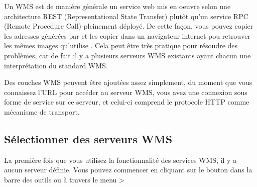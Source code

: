 Un WMS est de manière générale un service web mis en oeuvre selon une architecture REST (Representational State Transfer) plutôt qu'un service RPC (Remote Procedure Call) pleinement déployé. De cette façon, vous pouvez copier les adresses générées par \qg et les copier dans un navigateur internet pou retrouver les mêmes images qu'utilise \qg. Cela peut être très pratique pour résoudre des problèmes, car de fait il y a plusieurs serveurs WMS existants ayant chacun une interprétation du standard WMS.

Des couches WMS peuvent être ajoutées assez simplement, du moment que vous connaissez l'URL pour accéder au serveur WMS, vous avez une connexion sous forme de service sur ce serveur, et celui-ci comprend le protocole HTTP comme mécanisme de transport.

\subsection{Sélectionner des serveurs WMS}\label{sec:ogc-wms-servers}

La première fois que vous utilisez la fonctionnalité des services WMS, il y a aucun serveur définie. Vous pouvez commencer en cliquant sur le bouton  dans la barre des outils ou à travers le menu >

